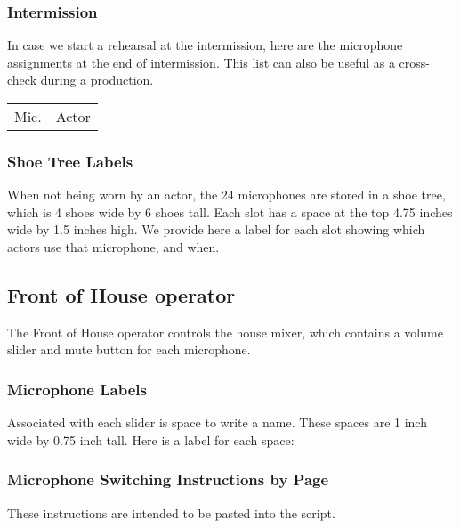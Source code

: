 \documentclass[letterpaper]{article}
\begin{document}
\subsubsection {Intermission}

In case we start a rehearsal at the intermission, here are the microphone
assignments at the end of intermission.  This list can also be useful as a 
cross-check during a production.

\begin{center}
\begin{longtable}{|l|l|}
\hline Mic. & Actor \endhead \hline

\end{longtable}
\end{center}

\subsubsection {Shoe Tree Labels}

When not being worn by an actor, the 24 microphones are stored in a shoe tree,
which is 4 shoes wide by 6 shoes tall.  
Each slot has a space at the top 4.75 inches wide
by 1.5 inches high.  We provide here a label for each slot showing which
actors use that microphone, and when.

{\Large

}

\subsection {Front of House operator}

The Front of House operator controls the house mixer, 
which contains a volume slider
and mute button for each microphone.  

\subsubsection {Microphone Labels}

Associated with each slider is space to write a name.  
These spaces are 1 inch wide by 0.75 inch tall.  
Here is a label for each space:

{\Large

}

\subsubsection {Microphone Switching Instructions by Page}

These instructions are intended to be pasted into the script.


\end{document}
